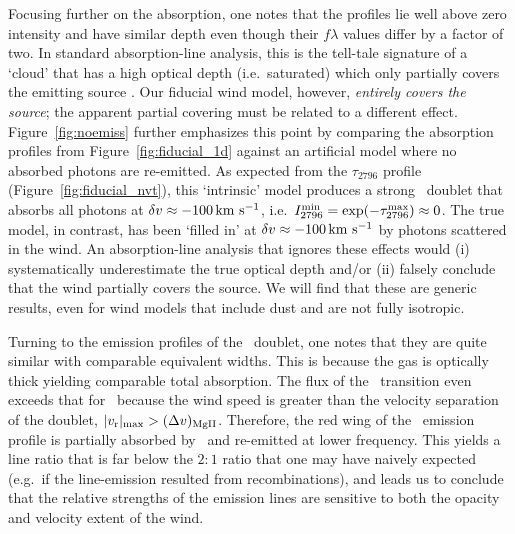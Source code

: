 \documentclass[12pt,preprint]{aastex}
\begin{document}
Focusing further on the  absorption, one notes that the profiles lie
well above zero intensity and have similar depth even though their $f\lambda$
values differ by a factor of two.  In standard absorption-line
analysis, this is 
the tell-tale signature of a `cloud' that has a high optical depth (i.e.\
saturated) which only partially covers the emitting source
\citep[e.g.][]{rvs05a,hkp+10}.  Our fiducial wind model, however, 
{\it entirely covers the source}; the apparent partial covering must
be related to a different effect.
Figure~\ref{fig:noemiss} further emphasizes this point by comparing the 
absorption profiles from Figure~\ref{fig:fiducial_1d} against an
artificial model where no absorbed photons are 
re-emitted.   As expected from the
$\tau_{2796}$ profile (Figure~\ref{fig:fiducial_nvt}), this
`intrinsic' model
produces a strong \mgiid\ doublet that absorbs all photons at
$\delta v \approx -100 \, {\rm km~s^{-1}}$, i.e.\ $I_{2796}^{\rm min} = \exp(-\tau^{\rm
  max}_{2796}) \approx 0$.
The true model, in contrast, has been `filled in' at $\delta v \approx -100
\, {\rm km~s^{-1}}$ by photons scattered in the wind.  An
absorption-line analysis that ignores these effects
would (i) systematically underestimate the true optical
depth and/or (ii) falsely conclude that the wind partially covers the
source.  We will find that these are
generic results, even for wind models that include
dust and are not fully isotropic.

Turning to the emission profiles of the \mgiid\ doublet, one notes
that they are quite similar with comparable equivalent widths.
This is because the gas is optically
thick yielding comparable total absorption. The
flux of the \mgiib\ transition even exceeds that for \mgiia\ 
because the wind speed is greater than the velocity separation
of the doublet, $|v_{\rm r}|_{\rm max} > (\Delta v)_{\rm MgII}$.
Therefore, the red wing of the
\mgiia\ emission profile is partially absorbed by \mgiib\ and
re-emitted at lower frequency.
This yields a
line ratio that is far below the $2:1$ ratio that one may have naively
expected (e.g.\ if the line-emission resulted from recombinations),
and leads us to conclude that the relative 
strengths of the emission lines are sensitive to both the opacity and
velocity extent of the wind. 
\end{document}
